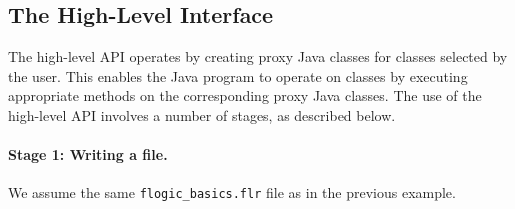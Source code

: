\subsection{The High-Level Interface}

The high-level API operates by creating proxy Java classes for 
\FLORA classes selected by the user.
This enables the Java program to operate on \FLORA classes by
executing appropriate methods on the corresponding proxy Java classes.
The use of the high-level API involves a number of stages, as described below.

\paragraph{Stage 1: Writing a \FLORA file.}
We assume the same {\tt flogic\_basics.flr} file as in the previous
example.

